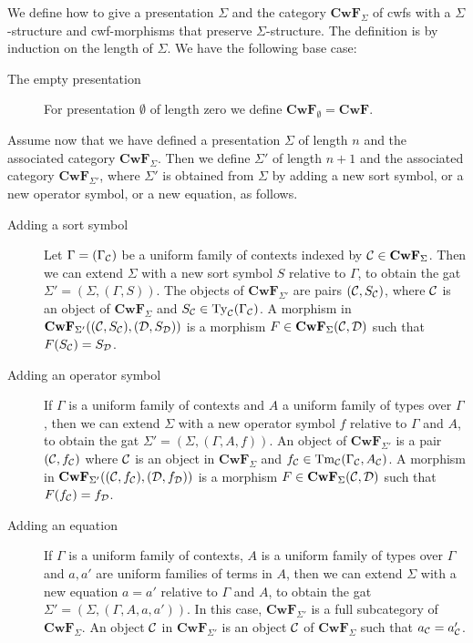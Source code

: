 \documentclass{lmcs}
\newcommand{\FYI}[1]{{\color{red}#1}}
\def\D{\mathcal{D}}
\def\Cwf{\mathbf{CwF}}
\begin{document}
\begin{definition}\label{def-sig-mod}
We define how to \FYI{give a presentation} $\Sigma$ and the category $\Cwf_\Sigma$ of cwfs with a $\Sigma$-structure and cwf-morphisms that preserve $\Sigma$-structure. The definition is by induction on the length of $\Sigma$. We have the following base case:
\begin{description}
\item[The empty \FYI{presentation}] For \FYI{presentation} $\emptyset$ of length zero we define $\Cwf_\emptyset = \Cwf$.
\end{description}
Assume now that we have defined a \FYI{presentation} $\Sigma$ of length $n$ and the associated
category $\Cwf_{\Sigma}$.
Then we define $\Sigma'$ of length $n+1$ and the associated category $\Cwf_{\Sigma'}$, where $\Sigma'$ is obtained from $\Sigma$ by adding a new sort symbol, or a new operator symbol, or a new equation, as follows.
\begin{description}
\item[Adding a sort symbol]
  Let $\Gamma = (\Gamma_{\mathcal C})$ be a uniform family of contexts indexed by $\C \in \Cwf_{\Sigma}$.
  Then we can extend $\Sigma$ with a new sort symbol $S$ relative to $\Gamma$, to obtain
  the gat $\Sigma' = (\Sigma,(\Gamma,S))$.
  The objects of $\Cwf_{\Sigma'}$ are pairs $({\mathcal C},S_{{\mathcal C}})$, where ${\mathcal C}$ is an object of $\Cwf_{\Sigma}$
  and $S_{{\mathcal C}} \in \mathrm{Ty}_{\mathcal C}(\Gamma_{{\mathcal C}})$.
  A morphism in $\Cwf_{\Sigma'}((\C,S_{\C}), (\D,S_{\D}))$
  is a morphism $F \in \Cwf_{\Sigma}(\C,\D)$ such that $F(S_\C) = S_\D$.
\item[Adding an operator symbol]
  If $\Gamma$ is a uniform family of contexts and $A$ a uniform family of
  types over $\Gamma$,
  then we can extend $\Sigma$ with a new operator
  symbol $f$ relative to $\Gamma$ and $A$, to obtain
  the gat $\Sigma' = (\Sigma,(\Gamma,A,f))$.
  An object of $\Cwf_{\Sigma'}$
  is a pair $({\mathcal C},f_{{\mathcal C}})$ where ${\mathcal C}$ is an object in $\Cwf_{\Sigma}$ and $f_{{\mathcal C}} \in \mathrm{Tm}_{\mathcal C}(\Gamma_{\mathcal C},A_{\mathcal C})$.
  A morphism in $\Cwf_{\Sigma'}((\C,f_{\C}),(\D,f_{\D}))$ is a morphism $F \in \Cwf_{\Sigma}(\C,\D)$ such that $F(f_{\C}) = f_{\D}$.
\item[Adding an equation]
  If $\Gamma$ is a uniform family of contexts,
  $A$ is a uniform family of types over $\Gamma$
  and $a,a'$ are uniform families of terms in $A$,
  then we can extend $\Sigma$ with a new equation $a = a'$ relative to $\Gamma$ and $A$, to obtain
  the gat $\Sigma' = (\Sigma,(\Gamma,A,a,a'))$.
  In this case,
  $\Cwf_{\Sigma'}$ is a full subcategory of $\Cwf_{\Sigma}$. An object ${\mathcal C}$ in
  $\Cwf_{\Sigma'}$ is an object ${\mathcal C}$ of $\Cwf_\Sigma$ such that $a_{{\mathcal C}} = a'_{{\mathcal C}}$.
\end{description}


\end{definition}
\end{document}
